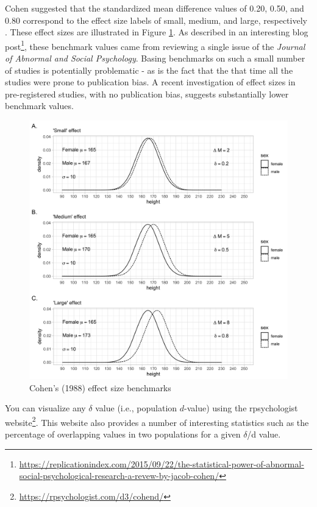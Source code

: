 \documentclass[
]{krantz}
\renewcommand{\href}[2]{#2\footnote{\url{#1}}}
\begin{document}
Cohen suggested that the standardized mean difference values of 0.20, 0.50, and 0.80 correspond to the effect size labels of small, medium, and large, respectively \citep{cohen1988}. These effect sizes are illustrated in Figure \ref{fig:dex4}. As described in an interesting \href{https://replicationindex.com/2015/09/22/the-statistical-power-of-abnormal-social-psychological-research-a-revew-by-jacob-cohen/}{blog post}, these benchmark values came from reviewing a single issue of the \emph{Journal of Abnormal and Social Psychology}. Basing benchmarks on such a small number of studies is potentially problematic - as is the fact that the that time all the studies were prone to publication bias. A recent investigation \citep[see][]{schafer2019meaningfulness} of effect sizes in pre-registered studies, with no publication bias, suggests substantially lower benchmark values.

\begin{figure}
\includegraphics[width=1\linewidth]{ch_populations/images/dvalue_ex4} \caption{Cohen's (1988) effect size benchmarks}\label{fig:dex4}
\end{figure}

You can visualize any \(\delta\) value (i.e., population \(d\)-value) using the rpsychologist \href{https://rpsychologist.com/d3/cohend/}{website}. This website also provides a number of interesting statistics such as the percentage of overlapping values in two populations for a given \(\delta\)/d value.
\end{document}

